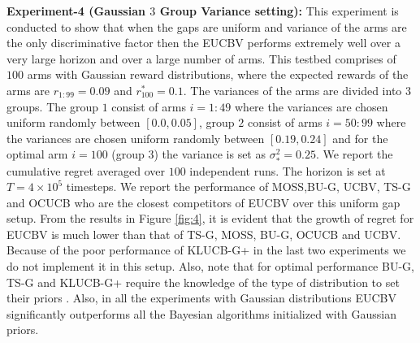 \textbf{Experiment-4 (Gaussian $3$ Group Variance setting):} This experiment is conducted to show that when the gaps are uniform and variance of the arms are the only discriminative factor then the EUCBV performs extremely well over a very large horizon and over a large number of arms. This testbed comprises of $100$ arms with Gaussian reward distributions, where the expected rewards of the arms are $r_{1:99}=0.09$ and $r^{*}_{100}=0.1$. The variances of the arms are divided into $3$ groups. The group $1$ consist of arms $i=1:49$ where the variances are chosen uniform randomly between $[0.0,0.05]$, group $2$ consist of arms $i=50:99$ where the variances are chosen uniform randomly between $[0.19,0.24]$ and for the optimal arm $i=100$ (group $3$) the variance is set as $\sigma_{*}^{2}=0.25$. We report the cumulative regret averaged over $100$ independent runs. The horizon is set at $T=4\times 10^{5}$ timesteps. We report the performance of MOSS,BU-G, UCBV, TS-G and OCUCB who are the closest competitors of EUCBV over this uniform gap setup. From the results in Figure \ref{fig:4}, it is evident that the growth of regret for EUCBV  is much lower than that of TS-G, MOSS, BU-G, OCUCB and UCBV. Because of the poor performance of KLUCB-G+ in the last two experiments we do not implement it in this setup. Also, note that for optimal performance BU-G, TS-G and KLUCB-G+ require the knowledge of the type of distribution to set their priors . Also, in all the experiments with Gaussian distributions EUCBV significantly outperforms all the Bayesian algorithms initialized with Gaussian priors.


